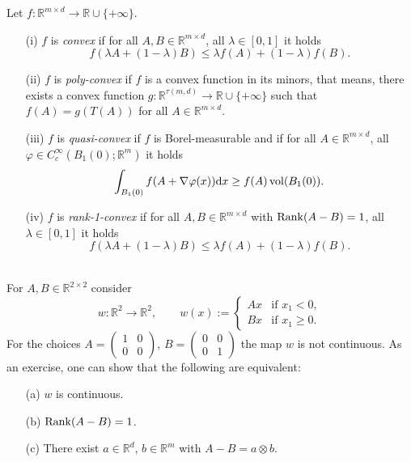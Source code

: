 \begin{definition}
Let $f:\mathbb{R}^{m\times d}\longrightarrow\mathbb{R}\cup\{+\infty\}$.
\begin{itemize}
	\item[(i)] $f$ is \textit{convex} if for all $A,B\in\mathbb{R}^{m\times d}$, all $\lambda\in[0,1]$ it holds
	\[f(\lambda A+(1-\lambda)B)\leq\lambda f(A)+(1-\lambda)f(B).\]
	\item[(ii)] $f$ is \textit{poly-convex} if $f$ is a convex function in its minors, that means, there exists a convex function $g:\mathbb{R}^{\tau(m,d)}\longrightarrow\mathbb{R}\cup\{+\infty\}$ such that $f(A)=g(T(A))$ for all $A\in\mathbb{R}^{m\times d}$.
	\item[(iii)] $f$ is \textit{quasi-convex} if $f$ is Borel-measurable and if for all $A\in\mathbb{R}^{m\times d}$, all $\varphi\in C_c^\infty(B_1(0);\mathbb{R}^m)$ it holds
	\[\int_{B_1(0)}{f(A+\nabla\varphi(x))\mathrm{d}x}\geq f(A)\operatorname{vol}\mathopen{}\left(B_1(0)\right)\mathclose{}.\]
	\item[(iv)] $f$ is \textit{rank-1-convex} if for all $A,B\in\mathbb{R}^{m\times d}$ with $\operatorname{Rank}\mathopen{}\left(A-B\right)\mathclose{}=1$, all $\lambda\in[0,1]$ it holds
	\[f(\lambda A+(1-\lambda)B)\leq\lambda f(A)+(1-\lambda)f(B).\]\\
\end{itemize}
\end{definition}


\begin{remark}
For $A,B\in\mathbb{R}^{2\times2}$ consider
\[w:\mathbb{R}^2\longrightarrow\mathbb{R}^2,\qquad w(x):=\left\{\begin{array}{rl}
	Ax&\text{if }x_1<0,\\
	Bx&\text{if }x_1\geq0.
\end{array}\right.\]
For the choices $A=\begin{pmatrix}1&0\\0&0\end{pmatrix}$, $B=\begin{pmatrix}0&0\\0&1\end{pmatrix}$ the map $w$ is not continuous. As an exercise, one can show that the following are equivalent:
\begin{itemize}
	\item[(a)] $w$ is continuous.
	\item[(b)] $\operatorname{Rank}\mathopen{}\left(A-B\right)\mathclose{}=1$.
	\item[(c)] There exist $a\in\mathbb{R}^d$, $b\in\mathbb{R}^m$ with $A-B=a\otimes b$.\\[11pt]
\end{itemize}
\end{remark}

